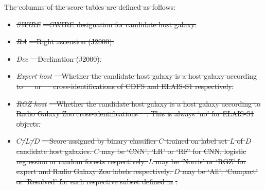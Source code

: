 \documentclass[11pt, a4paper]{book}
\providecommand{\DIFdeltex}[1]{{\protect\color{red}\sout{#1}}}                      %
\providecommand{\DIFdel}[1]{\texorpdfstring{\DIFdeltex{#1}}{}} %
\begin{document}
\DIFdel{The columns of the score tables are defined as follows:
  }%
\begin{itemize}%
\item%
\emph{\DIFdel{SWIRE}}%
\DIFdel{---SWIRE designation for candidate host galaxy.
    }%
\item%
\emph{\DIFdel{RA}}%
\DIFdel{---Right ascension (J2000).
    }%
\item%
\emph{\DIFdel{Dec}}%
\DIFdel{---Declination (J2000).
    }%
\item%
\emph{\DIFdel{Expert host}}%
\DIFdel{---Whether the candidate host galaxy is a host galaxy according to \mbox{%
\citet{norris06} }\hspace{0pt}%
or \mbox{%
\citet{middelberg08} }\hspace{0pt}%
cross-identifications of CDFS and ELAIS-S1 respectively.
    }%
\item%
\emph{\DIFdel{RGZ host}}%
\DIFdel{---Whether the candidate host galaxy is a host galaxy according to Radio Galaxy Zoo cross-identifications \mbox{%
\citep{wong21rgz}}\hspace{0pt}%
. This is always `no' for ELAIS-S1 objects.
    }%
\item%
\emph{\DIFdel{$C$/$L$/$D$}}%
\DIFdel{---Score assigned by binary classifier $C$ trained on label set $L$ of $D$ candidate host galaxies. $C$ may be `CNN', `LR' or `RF' for CNN, logistic regression or random forests respectively. $L$ may be `Norris' or `RGZ' for expert and Radio Galaxy Zoo labels respectively. $D$ may be `All', `Compact' or `Resolved' for each respective subset defined in }%
\DIFdel{.
  }
\end{itemize}%
\end{document}
